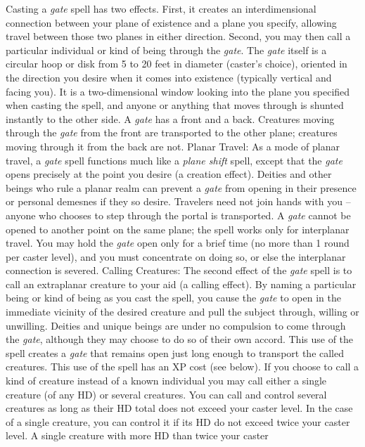 Casting a \textit{gate} spell has two effects. First, it creates an interdimensional
connection between your plane of existence and a plane you specify, allowing travel
between those two planes in either direction.
Second, you may then call a particular individual or kind of being through the
\textit{gate}.
The \textit{gate} itself is a circular hoop or disk from 5 to 20 feet in diameter
(caster's choice), oriented in the direction you desire when it comes into existence
(typically vertical and facing you). It is a two-dimensional window looking into
the plane you specified when casting the spell, and anyone or anything that moves
through is shunted instantly to the other side.
A \textit{gate} has a front and a back. Creatures moving through the \textit{gate
}from the front are transported to the other plane; creatures moving through it
from the back are not.
Planar Travel: As a mode of planar travel, a \textit{gate} spell functions
much like a \textit{plane shift} spell, except that the \textit{gate} opens precisely
at the point you desire (a creation effect). Deities and other beings who rule
a planar realm can prevent a \textit{gate} from opening in their presence or personal
demesnes if they so desire. Travelers need not join hands with you -- anyone who
chooses to step through the portal is transported. A \textit{gate} cannot be opened
to another point on the same plane; the spell works only for interplanar travel.
You may hold the \textit{gate} open only for a brief time (no more than 1 round
per caster level), and you must concentrate on doing so, or else the interplanar
connection is severed.
Calling Creatures: The second effect of the \textit{gate} spell is to
call an extraplanar creature to your aid (a calling effect). By naming a particular
being or kind of being as you cast the spell, you cause the \textit{gate} to open
in the immediate vicinity of the desired creature and pull the subject through,
willing or unwilling. Deities and unique beings are under no compulsion to come
through the \textit{gate}, although they may choose to do so of their own accord.
This use of the spell creates a \textit{gate} that remains open just long enough
to transport the called creatures. This use of the spell has an XP cost (see below).
If you choose to call a kind of creature instead of a known individual you may
call either a single creature (of any HD) or several creatures. You can call and
control several creatures as long as their HD total does not exceed your caster
level. In the case of a single creature, you can control it if its HD do not exceed
twice your caster level. A single creature with more HD than twice your caster
